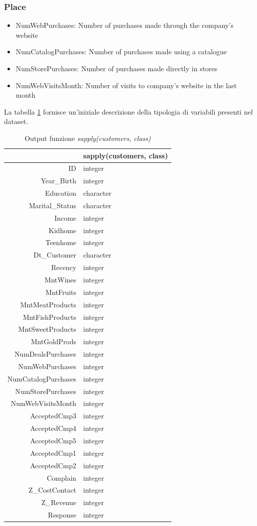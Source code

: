\documentclass[letterpaper,11pt]{article}
\begin{document}
\subsubsection*{Place}
\begin{itemize}
\item NumWebPurchases: Number of purchases made through the company’s website
\item NumCatalogPurchases: Number of purchases made using a catalogue
\item NumStorePurchases: Number of purchases made directly in stores
\item NumWebVisitsMonth: Number of visits to company’s website in the last month
\end{itemize}
La tabella \ref{fig:sapply(customers, class)} fornisce un'iniziale descrizione della tipologia di variabili presenti nel dataset. \\
\begin{table}[h!t]
\centering
\begin{tabular}{rl}
  \hline
 & sapply(customers, class) \\ 
  \hline
ID & integer \\ 
  Year\_Birth & integer \\ 
  Education & character \\ 
  Marital\_Status & character \\ 
  Income & integer \\ 
  Kidhome & integer \\ 
  Teenhome & integer \\ 
  Dt\_Customer & character \\ 
  Recency & integer \\ 
  MntWines & integer \\ 
  MntFruits & integer \\ 
  MntMeatProducts & integer \\ 
  MntFishProducts & integer \\ 
  MntSweetProducts & integer \\ 
  MntGoldProds & integer \\ 
  NumDealsPurchases & integer \\ 
  NumWebPurchases & integer \\ 
  NumCatalogPurchases & integer \\ 
  NumStorePurchases & integer \\ 
  NumWebVisitsMonth & integer \\ 
  AcceptedCmp3 & integer \\ 
  AcceptedCmp4 & integer \\ 
  AcceptedCmp5 & integer \\ 
  AcceptedCmp1 & integer \\ 
  AcceptedCmp2 & integer \\ 
  Complain & integer \\ 
  Z\_CostContact & integer \\ 
  Z\_Revenue & integer \\ 
  Response & integer \\ 
   \hline
\end{tabular}
\caption{Output funzione \textit{sapply(customers, class)}}
\label{fig:sapply(customers, class)}
\end{table}
\end{document}

